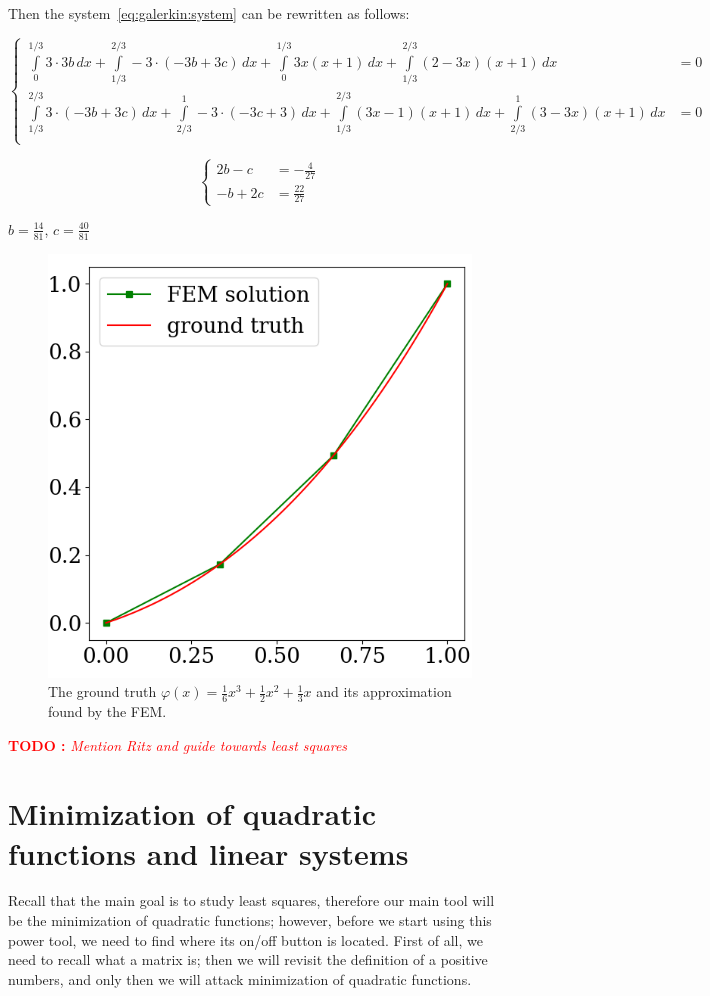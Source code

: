\documentclass[notitlepage]{report}
\newcommand\TODO[1]{\textcolor{red}{{\bf TODO :} \it #1}}
\begin{document}
Then the system~\eqref{eq:galerkin:system} can be rewritten as follows:

$$
\left\{
\begin{split}
\int\limits_{0}^{1/3} 3\cdot 3b\,dx + \int\limits_{1/3}^{2/3} -3\cdot (-3b+3c)\, dx + \int\limits_{0}^{1/3} 3x(x+1)\,dx + \int\limits_{1/3}^{2/3}(2-3x)(x+1)\,dx &= 0\\
\int\limits_{1/3}^{2/3} 3\cdot (-3b+3c)\,dx + \int\limits_{2/3}^{1} -3\cdot (-3c+3)\, dx + \int\limits_{1/3}^{2/3} (3x-1)(x+1)\,dx + \int\limits_{2/3}^{1}(3-3x)(x+1)\,dx &= 0\\
\end{split}
\right.
$$

$$
\left\{
\begin{split}
2b - c &= -\frac{4}{27}\\
-b + 2c &= \frac{22}{27}
\end{split}
\right.
$$

$b=\frac{14}{81}$, $c=\frac{40}{81}$
\begin{figure}[ht]
	\centering
	\includegraphics[width=.3\linewidth]{fem}
	\caption{The ground truth $\varphi(x) = \frac{1}{6} x^3 + \frac{1}{2} x^2 + \frac{1}{3} x$ and its approximation found by the FEM.}
	\label{fig:fem}
\end{figure}

\TODO{Mention Ritz and guide towards least squares}





\chapter{Minimization of quadratic functions and linear systems}

Recall that the main goal is to study least squares, therefore our main tool will be the minimization of quadratic functions;
however, before we start using this power tool, we need to find where its on/off button is located.
First of all, we need to recall what a matrix is; then we will revisit the definition of a positive numbers, and only then we will attack minimization of quadratic functions.
\end{document}
